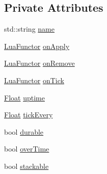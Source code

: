 \subsection*{Private Attributes}
\begin{DoxyCompactItemize}
\item 
std\+::string \hyperlink{classZeta_1_1EffectClass_ac20c1881c824fcb670d2eeb5e6cab3f1}{name}
\item 
\hyperlink{classZeta_1_1LuaFunctor}{Lua\+Functor} \hyperlink{classZeta_1_1EffectClass_a6b2d56017a95611770c31abffcb56ebe}{on\+Apply}
\item 
\hyperlink{classZeta_1_1LuaFunctor}{Lua\+Functor} \hyperlink{classZeta_1_1EffectClass_aba30418df52daa58a2c274a1faa7b9eb}{on\+Remove}
\item 
\hyperlink{classZeta_1_1LuaFunctor}{Lua\+Functor} \hyperlink{classZeta_1_1EffectClass_a14d197393f35d3ca3b61c000e8e573e0}{on\+Tick}
\item 
\hyperlink{namespaceZeta_a1e0a1265f9b3bd3075fb0fabd39088ba}{Float} \hyperlink{classZeta_1_1EffectClass_ad29c439f4a24e07879aa5d4c971ff892}{uptime}
\item 
\hyperlink{namespaceZeta_a1e0a1265f9b3bd3075fb0fabd39088ba}{Float} \hyperlink{classZeta_1_1EffectClass_a321f0c4dc9e8b1ed3b10fac54e6169b2}{tick\+Every}
\item 
bool \hyperlink{classZeta_1_1EffectClass_ab4dcfa9cda880a9a9ee33a18f1e8d89c}{durable}
\item 
bool \hyperlink{classZeta_1_1EffectClass_a03340f9f61382b97d518f6c2dd4fb646}{over\+Time}
\item 
bool \hyperlink{classZeta_1_1EffectClass_a785b3ab368d2d9ea24078ec8ceee863f}{stackable}
\end{DoxyCompactItemize}


